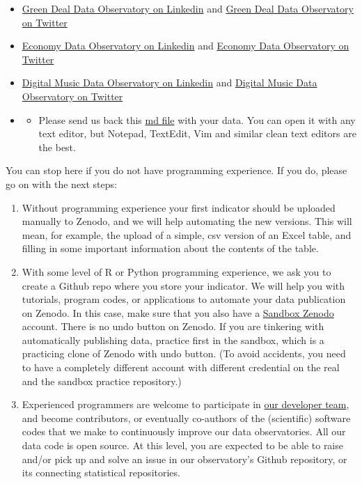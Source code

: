 \documentclass[
  a4paper,
  openany, a4paper, oneside]{book}
\providecommand{\tightlist}{%
  \setlength{\itemsep}{0pt}\setlength{\parskip}{0pt}}
\begin{document}
\begin{itemize}
\item
  \href{https://www.linkedin.com/company/78556699}{Green Deal Data Observatory on Linkedin} and \href{https://twitter.com/GreenDealObs}{Green Deal Data Observatory on Twitter}
\item
  \href{https://www.linkedin.com/company/78562153}{Economy Data Observatory on Linkedin} and \href{https://twitter.com/GreenDealObs}{Economy Data Observatory on Twitter}
\item
  \href{https://www.linkedin.com/company/reprexbv/}{Digital Music Data Observatory on Linkedin} and \href{https://twitter.com/dataandlyrics}{Digital Music Data Observatory on Twitter}
\item
  \begin{itemize}
  \tightlist
  \item
    Please send us back this \href{https://greendeal.dataobservatory.eu/media/documents/bio_template.md}{md file} with your data. You can open it with any text editor, but Notepad, TextEdit, Vim and similar clean text editors are the best.
  \end{itemize}
\end{itemize}

You can stop here if you do not have programming experience. If you do, please go on with the next steps:

\begin{enumerate}
\def\labelenumi{\arabic{enumi}.}
\setcounter{enumi}{5}
\item
  Without programming experience your first indicator should be uploaded manually to Zenodo, and we will help automating the new versions. This will mean, for example, the upload of a simple, csv version of an Excel table, and filling in some important information about the contents of the table.
\item
  With some level of R or Python programming experience, we ask you to create a Github repo where you store your indicator. We will help you with tutorials, program codes, or applications to automate your data publication on Zenodo. In this case, make sure that you also have a \href{https://sandbox.zenodo.org/}{Sandbox Zenodo} account. There is no undo button on Zenodo. If you are tinkering with automatically publishing data, practice first in the sandbox, which is a practicing clone of Zenodo with undo button. (To avoid accidents, you need to have a completely different account with different credential on the real and the sandbox practice repository.)
\item
  Experienced programmers are welcome to participate in \protect\hyperlink{tech}{our developer team}, and become contributors, or eventually co-authors of the (scientific) software codes that we make to continuously improve our data observatories. All our data code is open source. At this level, you are expected to be able to raise and/or pick up and solve an issue in our observatory's Github repository, or its connecting statistical repositories.
\end{enumerate}
\end{document}
